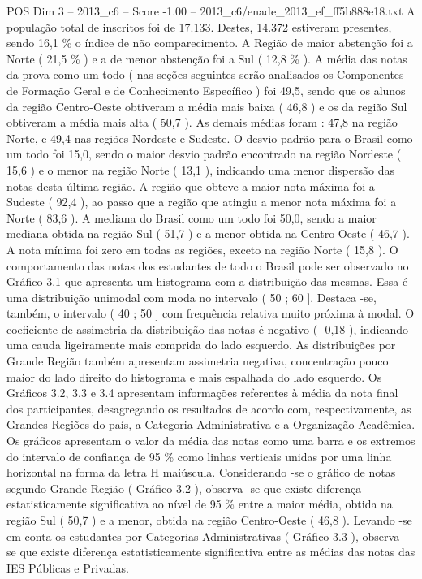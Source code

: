 \begin{textsample}{POS Dim 3 – 2013\_c6 – Score -1.00 – 2013\_c6/enade\_2013\_ef\_ff5b888e18.txt}
A população total de inscritos foi de 17.133.
Destes, 14.372 estiveram presentes, sendo 16,1 \% o índice de não comparecimento.
A Região de maior abstenção foi a Norte ( 21,5 \% ) e a de menor abstenção foi a Sul ( 12,8 \% ).
A média das notas da prova como um todo ( nas seções seguintes serão analisados os Componentes de Formação Geral e de Conhecimento Específico ) foi 49,5, sendo que os alunos da região Centro-Oeste obtiveram a média mais baixa ( 46,8 ) e os da região Sul obtiveram a média mais alta ( 50,7 ).
As demais médias foram : 47,8 na região Norte, e 49,4 nas regiões Nordeste e Sudeste.
O desvio padrão para o Brasil como um todo foi 15,0, sendo o maior desvio padrão encontrado na região Nordeste ( 15,6 ) e o menor na região Norte ( 13,1 ), indicando uma menor dispersão das notas desta última região.
A região que obteve a maior nota máxima foi a Sudeste ( 92,4 ), ao passo que a região que atingiu a menor nota máxima foi a Norte ( 83,6 ).
A mediana do Brasil como um todo foi 50,0, sendo a maior mediana obtida na região Sul ( 51,7 ) e a menor obtida na Centro-Oeste ( 46,7 ).
A nota mínima foi zero em todas as regiões, exceto na região Norte ( 15,8 ).
O comportamento das notas dos estudantes de todo o Brasil pode ser observado no Gráfico 3.1 que apresenta um histograma com a distribuição das mesmas.
Essa é uma distribuição unimodal com moda no intervalo ( 50 ; 60 ].
Destaca -se, também, o intervalo ( 40 ; 50 ] com frequência relativa muito próxima à modal.
O coeficiente de assimetria da distribuição das notas é negativo ( -0,18 ), indicando uma cauda ligeiramente mais comprida do lado esquerdo.
As distribuições por Grande Região também apresentam assimetria negativa, concentração pouco maior do lado direito do histograma e mais espalhada do lado esquerdo.
Os Gráficos 3.2, 3.3 e 3.4 apresentam informações referentes à média da nota final dos participantes, desagregando os resultados de acordo com, respectivamente, as Grandes Regiões do país, a Categoria Administrativa e a Organização Acadêmica.
Os gráficos apresentam o valor da média das notas como uma barra e os extremos do intervalo de confiança de 95 \% como linhas verticais unidas por uma linha horizontal na forma da letra H maiúscula.
Considerando -se o gráfico de notas segundo Grande Região ( Gráfico 3.2 ), observa -se que existe diferença estatisticamente significativa ao nível de 95 \% entre a maior média, obtida na região Sul ( 50,7 ) e a menor, obtida na região Centro-Oeste ( 46,8 ).
Levando -se em conta os estudantes por Categorias Administrativas ( Gráfico 3.3 ), observa -se que existe diferença estatisticamente significativa entre as médias das notas das IES Públicas e Privadas.

\end{textsample}
